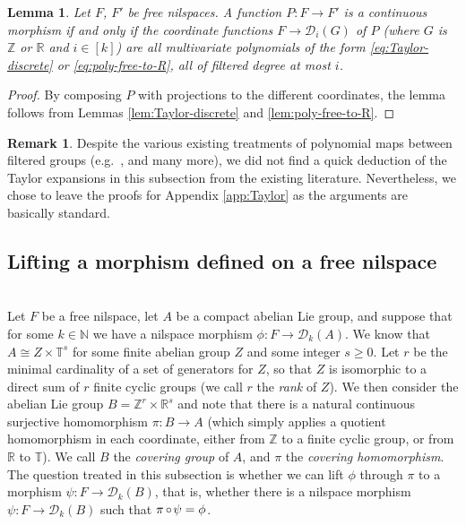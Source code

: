 \documentclass[a4paper,12pt,reqno]{amsart}
\newtheorem{lemma}[theorem]{Lemma}
\theoremstyle{definition}
\newtheorem{remark}[theorem]{Remark}
\def\to{\rightarrow}
\newcommand{\mc}{\mathcal}
\newcommand{\mb}{\mathbb}
\DeclareMathOperator{\co}{\circ\hspace{-0.02 cm}}
\begin{document}
\begin{lemma}\label{lem:mor-free-nil-as-poly} 
Let $F$, $F'$ be free nilspaces. A function $P:F\to F'$ is a continuous morphism if and only if the coordinate functions $F\to \mc{D}_i(G)$ of $P$ (where $G$ is $\mb{Z}$ or $\mb{R}$ and $i\in [k]$) are all multivariate polynomials of the form \eqref{eq:Taylor-discrete} or \eqref{eq:poly-free-to-R}, all of filtered degree at most $i$.
\end{lemma}


\begin{proof}
By composing $P$ with projections to the different coordinates, the lemma follows from Lemmas \ref{lem:Taylor-discrete} and  \ref{lem:poly-free-to-R}.
\end{proof}

\begin{remark}
Despite the various existing treatments of polynomial maps between filtered groups (e.g.\ \cite[Appendix B]{GTZ}, \cite[\S 2.2]{Cand:Notes1} and many more), we did not find a quick deduction of the Taylor expansions in this subsection from the existing literature. Nevertheless, we chose to leave the proofs for Appendix \ref{app:Taylor} as the arguments are basically standard. 
\end{remark}



\subsection{Lifting a morphism defined on a free nilspace}\label{subsec:lift-inv-free-nil}\hfill\\
Let $F$ be a free nilspace, let $A$ be a compact abelian Lie group, and suppose that for some $k\in \mb{N}$ we have a nilspace morphism $\phi:F\to\mc{D}_k(A)$. We know that $A\cong Z\times \mb{T}^s$ for some finite abelian group $Z$ and some integer $s\geq 0$. Let $r$ be the minimal cardinality of a set of generators for $Z$, so that $Z$ is isomorphic to a direct sum of $r$ finite cyclic groups (we call $r$  the \emph{rank} of $Z$). We then consider the abelian Lie group $B=\mb{Z}^r\times \mb{R}^s$ and note that there is a natural continuous surjective homomorphism $\pi:B\to A$ (which simply applies a quotient homomorphism in each coordinate, either from $\mb{Z}$ to a finite cyclic group, or from $\mb{R}$ to $\mb{T}$). We call $B$ the \emph{covering group} of $A$, and $\pi$ the \emph{covering homomorphism}. The question treated in this subsection is whether we can lift $\phi$ through $\pi$ to a morphism $\psi:F\to \mc{D}_k(B)$, that is, whether there is a nilspace morphism $\psi:F\to\mc{D}_k(B)$ such that $\pi\co\psi=\phi$.
\end{document}
